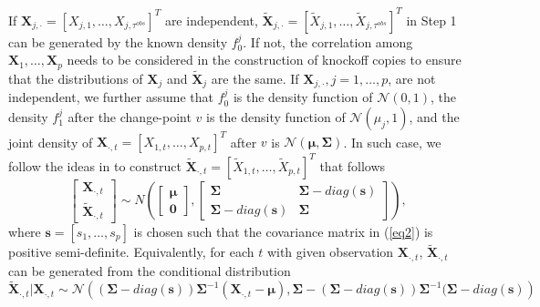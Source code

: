 \documentclass[]{interact}
\theoremstyle{plain}%
\theoremstyle{definition}
\theoremstyle{remark}
\begin{document}
If $\bm X_{j,\cdot} = [X_{j,1}, \ldots, X_{j,\tau^{obs}}]^T$ are independent, $\bm{\tilde X}_{j,\cdot} = [\tilde X_{j,1}, \ldots, \tilde X_{j,\tau^{obs}}]^T$ in Step 1 can be generated by the known density $f_0^j$. If not, the correlation among $\bm X_1, \ldots, \bm X_p$ needs to be considered in the construction of knockoff copies to ensure that the distributions of $\bm X_j$ and $\bm{\tilde X}_j$ are the same. If $\bm X_{j,\cdot}, j=1,\ldots,p$, are not independent, we further assume that $f^j_0$ is the density function of $\mathcal{N} (0,1)$, the density $f_1^j$ after the change-point $v$ is the density function of $\mathcal{N} (\mu_j, 1)$, and the joint density of $\bm X_{\cdot, t} = [X_{1,t}, \ldots, X_{p,t}]^T$ after $v$ is $\mathcal{N} (\bm \mu, \bm \Sigma)$. In such case, we follow the ideas in \cite{barber2015controlling} to construct $\bm{\tilde X}_{\cdot, t} = [\tilde X_{1,t}, \ldots, \tilde X_{p,t}]^T$ that follows 
\begin{equation} \label{eq2}
\begin{bmatrix}
\bm X_{\cdot,t} \\
\bm{\tilde X }_{\cdot,t}
\end{bmatrix}
\sim
N \left ( 
\begin{bmatrix}
\bm \mu \\
\bm 0
\end{bmatrix},
\begin{bmatrix} 
\bm \Sigma & \bm \Sigma - diag(\bm s) \\ 
\bm \Sigma - diag(\bm s) & \bm \Sigma 
\end{bmatrix}
\right),
\end{equation}
where $\bm s = [s_1, \ldots, s_p]$ is chosen such that the covariance matrix in (\ref{eq2}) is positive semi-definite. Equivalently, for each $t$ with given observation $\bm X_{\cdot, t}$, $\bm{\tilde X}_{\cdot, t}$ can be generated from the conditional distribution
\begin{equation}\label{eq3}
\bm{\tilde X}_{\cdot, t}|\bm X_{\cdot, t} \sim \mathcal{N}\left((\bm \Sigma - diag(\bm s))\bm \Sigma^{-1} (\bm X_{\cdot,t} - \bm \mu), \bm \Sigma - (\bm \Sigma-diag(\bm s))\bm \Sigma^{-1}(\bm \Sigma-diag(\bm s)\right)
\end{equation}
\end{document}
